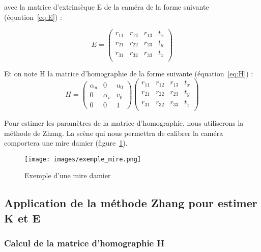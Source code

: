 \documentclass[12pt]{article}
\begin{document}
avec la matrice d'extrinsèque E de la caméra de la forme suivante (équation~\ref{eq:E}) :

\begin{equation}
    E = 
\begin{pmatrix}
r_{11} & r_{12} & r_{13} & t_x \\
r_{21} & r_{22} & r_{23} & t_y \\
r_{31} & r_{32} & r_{33} & t_z \\
\end{pmatrix}
\label{eq:E}
\end{equation}

Et on note H la matrice d'homographie de la forme suivante (équation~\ref{eq:H}) :
\begin{equation}
    H =
\begin{pmatrix}
\alpha_{u} & 0 & u_0 \\
0 & \alpha_{v} & v_0 \\
0 & 0 & 1
\end{pmatrix}
\begin{pmatrix}
r_{11} & r_{12} & r_{13} & t_x \\
r_{21} & r_{22} & r_{23} & t_y \\
r_{31} & r_{32} & r_{33} & t_z \\
\end{pmatrix}
\label{eq:H}
\end{equation}

Pour estimer les paramètres de la matrice d'homographie, nous utiliserons la méthode de Zhang.
La scène qui nous permettra de calibrer la caméra comportera une mire damier (figure~\ref{fig:chessboard}).

\begin{figure}[H]
\centering
\texttt{[image: images/exemple\_mire.png]}
\caption{Exemple d'une mire damier}
\label{fig:chessboard}
\end{figure}

\subsection{Application de la méthode Zhang pour estimer K et E}

\subsubsection{Calcul de la matrice d'homographie H}
\end{document}
